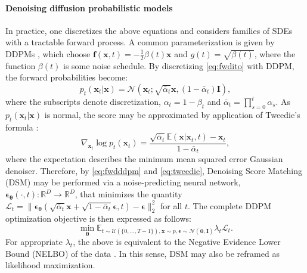 \documentclass{article}
\theoremstyle{remark}
\begin{document}
\paragraph{Denoising diffusion probabilistic models}
In practice, one discretizes the above equations and considers families of SDEs with a tractable forward process. A common parameterization is given by DDPMs \citep{NEURIPS2020_4c5bcfec}, which choose $\boldsymbol{f}(\boldsymbol{x},t)=-\frac{1}{2}\beta(t)\boldsymbol{x}$ and $g(t)=\sqrt{\beta(t)}$, where the function $\beta(t)$ is some noise schedule. By discretizing \eqref{eq:fwdito} with DDPM, the forward probabilities become:
\begin{equation}
    \label{eq:fwdddpm}
    p_{t}(\boldsymbol{x}_t|\boldsymbol{x})=\mathcal{N}(\boldsymbol{x}_t;\sqrt{\bar{\alpha}_t}\boldsymbol{x},(1-\bar{\alpha}_t)\boldsymbol{I}),
\end{equation}
where the subscripts denote discretization, $\alpha_t=1-\beta_t$ and $\bar{\alpha}_t=\prod_{s=0}^{t}\alpha_s$. As $p_{t}(\boldsymbol{x}_t|\boldsymbol{x})$ is normal, the score may be approximated by application of Tweedie's formula \citep{04f9ad2d-909a-34da-ad09-b5ac91b665b6}:
\begin{equation}
    \label{eq:tweedie}
    \nabla_{\boldsymbol{x}_t}\log p_t(\boldsymbol{x}_t)=\frac{\sqrt{\bar{\alpha}_t}\mathbb{E}(\boldsymbol{x}|\boldsymbol{x}_t, t)-\boldsymbol{x}_t}{1-\bar{\alpha}_t},
\end{equation}
where the expectation describes the minimum mean squared error Gaussian denoiser. Therefore, by \eqref{eq:fwdddpm} and \eqref{eq:tweedie}, Denoising Score Matching (DSM) may be performed via a noise-predicting neural network, $\boldsymbol{\epsilon_\theta}(\cdot, t):\mathbb{R}^D\to\mathbb{R}^D$, that minimizes the quantity $\mathcal{L}_t=\|\boldsymbol{\epsilon_\theta}(\sqrt{\bar{\alpha}_t}\boldsymbol{x}+\sqrt{1-\bar{\alpha}_t}\boldsymbol{\epsilon},t)-\boldsymbol{\epsilon}\|^2_2$ for all $t$. The complete DDPM optimization objective is then expressed as follows:
\begin{equation}
\min_{\boldsymbol{\theta}}\mathbb{E}_{t\sim\mathcal{U}(\{0, \dots, T-1\}), \boldsymbol{x}\sim p, \boldsymbol{\epsilon}\sim\mathcal{N}(\boldsymbol{0},\boldsymbol{I})}\lambda_t\mathcal{L}_t.
\end{equation}
For appropriate $\lambda_t$, the above is equivalent to the Negative Evidence Lower Bound (NELBO) of the data \citep{NEURIPS2020_4c5bcfec}. In this sense, DSM may also be reframed as likelihood maximization.
\end{document}
